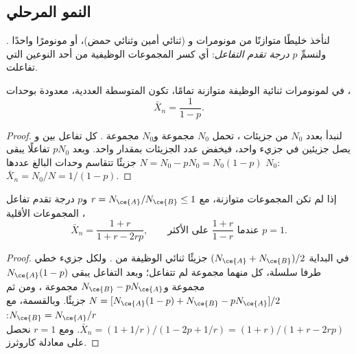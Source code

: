 \subsection*{النمو المرحلي}

لنأخذ خليطًا متوازنًا من مونومرات  و (ثنائي أمين وثنائي حمض)، أو مونومرًا واحدًا
. ولنسمِّ $p$ \emph{درجة تقدم التفاعل}: أي كسر المجموعات الوظيفية من أحد
النوعين التي تفاعلت.

\begin{theorem}\label{thm:b2:polymer-synthesis:carothers}
في  لمونومرات ثنائية الوظيفة متوازنة تمامًا، تكون  المتوسطة العددية، معدودة بوحدات ،
\begin{equation*}
\bar X_n = \frac{1}{1 - p}.
\end{equation*}
\end{theorem}

\begin{proof}
لنبدأ بعدد $N_0$ من جزيئات ، تحمل $N_0$ مجموعة  و$N_0$ مجموعة . كل تفاعل
بين  و يصل جزيئين في جزيء واحد، فيخفض عدد الجزيئات بمقدار
واحد. وبعد $pN_0$ تفاعلًا يبقى $N = N_0 - pN_0 = N_0(1-p)$ جزيئًا تتقاسم وحدات  البالغ عددها
$N_0$: $\bar X_n = N_0/N = 1/(1-p)$.
\end{proof}

\begin{corollary}\label{cor:b2:polymer-synthesis:imbalance}
إذا لم تكن المجموعات متوازنة، مع $r = N_{\ce{A}}/N_{\ce{B}} \le 1$ و$p$ درجة تقدم تفاعل
المجموعات الأقلية ،
\begin{equation*}
\bar X_n = \frac{1 + r}{1 + r - 2rp}, \qquad \text{على الأكثر } \frac{1+r}{1-r} \text{ عندما } p = 1.
\end{equation*}
\end{corollary}

\begin{proof}
في البداية $(N_{\ce{A}} + N_{\ce{B}})/2$ جزيئًا ثنائي الوظيفة من . ولكل جزيء
خطي طرفا سلسلة، كل منهما مجموعة لم تتفاعل؛ وبعد التفاعل يبقى $N_{\ce{A}}(1-p)$
مجموعة  و$N_{\ce{B}} - pN_{\ce{A}}$ مجموعة ، ومن ثم $N = [N_{\ce{A}}(1-p) + N_{\ce{B}} -
pN_{\ce{A}}]/2$ جزيئًا. وبالقسمة، مع $N_{\ce{B}} = N_{\ce{A}}/r$:
$\bar X_n = (1 + 1/r)/(1 - 2p + 1/r) = (1+r)/(1 + r - 2rp)$. ومع $r = 1$ نحصل على معادلة كاروثرز.
\end{proof}

